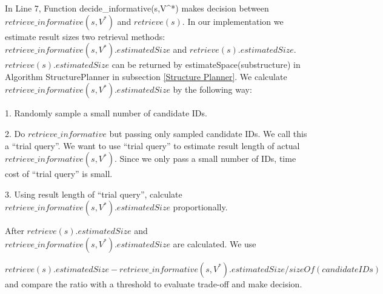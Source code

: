 In Line 7, Function decide\_informative(s,V^{*}) makes decision between $retrieve\_{informative}(s, V^{*})$ and $retrieve(s)$. In our implementation we estimate result sizes two retrieval methods: $retrieve\_{informative}(s, V^{*}).estimatedSize$ and $retrieve(s).estimatedSize$. $retrieve(s).estimatedSize$ can be returned by estimateSpace(substructure) in Algorithm StructurePlanner in subsection \ref{Structure Planner}. We calculate $retrieve\_{informative}(s, V^{*}).estimatedSize$ by the following way:

1. Randomly sample a small number of candidate IDs.  

2. Do $retrieve\_{informative}$ but passing only sampled candidate IDs. We call this a ``trial query''. We want to use ``trial query'' to estimate result length of actual $retrieve\_{informative}(s, V^{*})$. Since we only pass a small number of IDs, time cost of ``trial query'' is small.

3. Using result length of ``trial query'', calculate $retrieve\_{informative}(s, V^{*}).estimatedSize$ proportionally.

After $retrieve(s).estimatedSize$ and $retrieve\_{informative}(s, V^{*}).estimatedSize$ are calculated. We use 

$retrieve(s).estimatedSize - retrieve\_{informative}(s, V^{*}).estimatedSize / sizeOf(candidateIDs)$ and compare the ratio with a threshold to evaluate trade-off and make decision.


